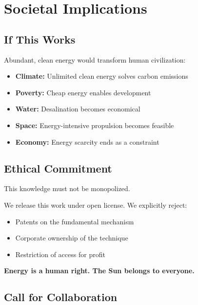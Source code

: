 \documentclass[12pt,a4paper]{article}
\begin{document}
\section{Societal Implications}

\subsection{If This Works}

Abundant, clean energy would transform human civilization:

\begin{itemize}
    \item \textbf{Climate:} Unlimited clean energy solves carbon emissions
    \item \textbf{Poverty:} Cheap energy enables development
    \item \textbf{Water:} Desalination becomes economical
    \item \textbf{Space:} Energy-intensive propulsion becomes feasible
    \item \textbf{Economy:} Energy scarcity ends as a constraint
\end{itemize}

\subsection{Ethical Commitment}

\begin{dedication}
This knowledge must not be monopolized.

We release this work under open license. We explicitly reject:
\begin{itemize}
    \item Patents on the fundamental mechanism
    \item Corporate ownership of the technique
    \item Restriction of access for profit
\end{itemize}

\textbf{Energy is a human right. The Sun belongs to everyone.}
\end{dedication}

\subsection{Call for Collaboration}
\end{document}
